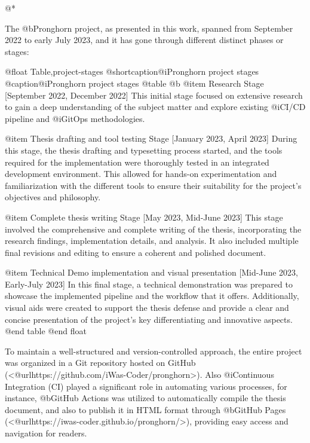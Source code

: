 @*

The @b{Pronghorn} project, as presented in this work, spanned from September 2022 to early July 2023, and it has gone through different distinct phases or stages:

@float Table,project-stages
@shortcaption{@i{Pronghorn} project stages}
@caption{@i{Pronghorn} project stages}
@table @b
@item Research Stage [September 2022, December 2022]
This initial stage focused on extensive research to gain a deep understanding of the subject matter and explore existing @i{CI/CD pipeline} and @i{GitOps} methodologies.

@item Thesis drafting and tool testing Stage [January 2023, April 2023]
During this stage, the thesis drafting and typesetting process started, and the tools required for the implementation were thoroughly tested in an integrated development environment. This allowed for hands-on experimentation and familiarization with the different tools to ensure their suitability for the project's objectives and philosophy.

@item Complete thesis writing Stage [May 2023, Mid-June 2023]
This stage involved the comprehensive and complete writing of the thesis, incorporating the research findings, implementation details, and analysis. It also included multiple final revisions and editing to ensure a coherent and polished document.

@item Technical Demo implementation and visual presentation [Mid-June 2023, Early-July 2023]
In this final stage, a technical demonstration was prepared to showcase the implemented pipeline and the workflow that it offers. Additionally, visual aids were created to support the thesis defense and provide a clear and concise presentation of the project's key differentiating and innovative aspects.
@end table
@end float

To maintain a well-structured and version-controlled approach, the entire project was organized in a Git repository hosted on GitHub (<@url{https://github.com/iWas-Coder/pronghorn}>). Also @i{Continuous Integration (CI)} played a significant role in automating various processes, for instance, @b{GitHub Actions} was utilized to automatically compile the thesis document, and also to publish it in HTML format through @b{GitHub Pages} (<@url{https://iwas-coder.github.io/pronghorn/}>), providing easy access and navigation for readers.
